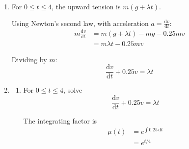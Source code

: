 \documentclass[leqno]{article}
\begin{document}
\begin{enumerate}[
  label=\textbf{\arabic*.},
  leftmargin=*,
  topsep=0pt,
  partopsep=0pt,
  parsep=0pt
]
\begin{djsSolution}
\begin{enumerate}[label=\textbf{(\alph*)}]
\begin{enumerate}[label=(\roman*)]
    Hence
    \[
    v = ce^{-t/4} - g
    \]

    The cage comes to rest at $t=8$, so $v(8)=0$. Therefore
    \begin{align*}
    0 &= ce^{-8/4} - g \\
    0 &= ce^{-2} - g \\
    c &= ge^2
    \end{align*}

    Substituting for $c$:
    \begin{align*}
    v &= ge^2e^{-t/4} - g \\
    &= g\left(e^{2-t/4}-1\right)
    \end{align*}

    So, for $4 \le t \le 8$:
    \[
    v = g\left(e^{2-t/4}-1\right)
    \]

    \item Using the result from part (i):
    \begin{align*}
    v(4) &= g\left(e^{2-4/4}-1\right) \\
    &= g\left(e^1-1\right) \\
    &= g(e-1)
    \end{align*}

    With $g=9.8$:
    \[
    v(4) \approx 9.8(e-1) \approx 16.8\,\mathrm{m\,s^{-1}}
    \]

    So the velocity when $t=4$ is $g(e-1)\,\mathrm{m\,s^{-1}} \approx 16.8\,\mathrm{m\,s^{-1}}$.
  \end{enumerate}

  \item For $0 \le t \le 4$, the upward tension is $m(g+\lambda t)$.

  Using Newton's second law, with acceleration $a=\frac{\mathrm{d}v}{\mathrm{d}t}$:
  \begin{align*}
  m\frac{\mathrm{d}v}{\mathrm{d}t} &= m(g+\lambda t) - mg - 0.25mv \\
  &= m\lambda t - 0.25mv
  \end{align*}

  Dividing by $m$:
  \[
  \frac{\mathrm{d}v}{\mathrm{d}t} + 0.25v = \lambda t
  \]

  \item
  \begin{enumerate}[label=(\roman*)]
    \item For $0 \le t \le 4$, solve
    \[
    \frac{\mathrm{d}v}{\mathrm{d}t} + 0.25v = \lambda t
    \]

    The integrating factor is
    \begin{align*}
    \mu(t)&=e^{\int 0.25\,\mathrm{d}t}\\
    &=e^{t/4}
    \end{align*}


\end{enumerate}
\end{enumerate}
\end{djsSolution}
\end{enumerate}
\end{document}
